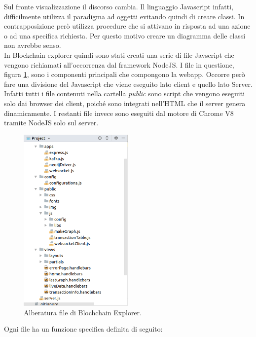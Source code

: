 Sul fronte visualizzazione il discorso cambia. Il linguaggio Javascript infatti, difficilmente utilizza il paradigma ad oggetti evitando quindi di creare classi. In contrapposizione però utilizza procedure che si attivano in risposta ad una azione o ad una specifica richiesta. Per questo motivo creare un diagramma delle classi non avrebbe senso.
\\ In Blockchain explorer quindi sono stati creati una serie di file Javscript che vengono richiamati all'occorrenza dal framework NodeJS. I file in questione, figura \ref{fig:rootWebApp}, sono i componenti principali che compongono la webapp. Occorre però fare una divisione del Javascript che viene eseguito lato client e quello lato Server. Infatti tutti i file contenuti nella cartella \textit{public} sono script che vengono eseguiti solo dai browser dei client, poiché sono integrati nell'HTML che il server genera dinamicamente. I restanti file invece sono eseguiti dal motore di Chrome V8 tramite NodeJS solo sul server.
\begin{figure}[H]
	\centering
	\includegraphics[width=0.5\textwidth, height=0.45\textheight, keepaspectratio]{images/webAppRoot.png}
	\caption{Alberatura file di Blochchain Explorer.}
	\label{fig:rootWebApp}
\end{figure}
Ogni file ha un funzione specifica definita di seguito:
